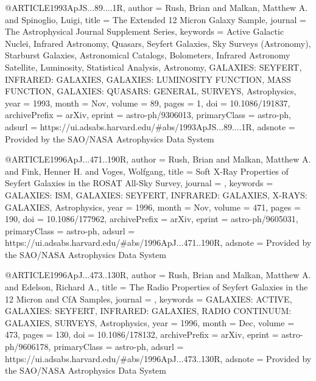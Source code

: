 \documentclass[longauth]{aa}
\begin{document}
{{{@ARTICLE{1993ApJS...89....1R,
       author = {{Rush}, Brian and {Malkan}, Matthew A. and {Spinoglio}, Luigi},
       title = {The Extended 12 Micron Galaxy Sample},
      journal = {The Astrophysical Journal Supplement Series},
     keywords = {Active Galactic Nuclei, Infrared Astronomy, Quasars, Seyfert Galaxies, Sky Surveys (Astronomy), Starburst Galaxies, Astronomical Catalogs, Bolometers, Infrared Astronomy Satellite, Luminosity, Statistical Analysis, Astronomy, GALAXIES: SEYFERT, INFRARED: GALAXIES, GALAXIES: LUMINOSITY FUNCTION, MASS FUNCTION, GALAXIES: QUASARS: GENERAL, SURVEYS, Astrophysics},
         year = 1993,
        month = Nov,
       volume = {89},
        pages = {1},
          doi = {10.1086/191837},
archivePrefix = {arXiv},
       eprint = {astro-ph/9306013},
 primaryClass = {astro-ph},
       adsurl = {https://ui.adsabs.harvard.edu/#abs/1993ApJS...89....1R},
      adsnote = {Provided by the SAO/NASA Astrophysics Data System}
}

@ARTICLE{1996ApJ...471..190R,
       author = {{Rush}, Brian and {Malkan}, Matthew A. and {Fink}, Henner H. and {Voges}, Wolfgang},
        title = {Soft X-Ray Properties of Seyfert Galaxies in the ROSAT All-Sky Survey},
      journal = {\apj},
     keywords = {GALAXIES: ISM, GALAXIES: SEYFERT, INFRARED: GALAXIES, X-RAYS: GALAXIES, Astrophysics},
         year = 1996,
        month = Nov,
       volume = {471},
        pages = {190},
          doi = {10.1086/177962},
archivePrefix = {arXiv},
       eprint = {astro-ph/9605031},
 primaryClass = {astro-ph},
       adsurl = {https://ui.adsabs.harvard.edu/#abs/1996ApJ...471..190R},
      adsnote = {Provided by the SAO/NASA Astrophysics Data System}
}

@ARTICLE{1996ApJ...473..130R,
       author = {{Rush}, Brian and {Malkan}, Matthew A. and {Edelson}, Richard A.},
        title = {The Radio Properties of Seyfert Galaxies in the 12 Micron and CfA Samples},
      journal = {\apj},
     keywords = {GALAXIES: ACTIVE, GALAXIES: SEYFERT, INFRARED: GALAXIES, RADIO CONTINUUM: GALAXIES, SURVEYS, Astrophysics},
         year = 1996,
        month = Dec,
       volume = {473},
        pages = {130},
          doi = {10.1086/178132},
archivePrefix = {arXiv},
       eprint = {astro-ph/9606178},
 primaryClass = {astro-ph},
       adsurl = {https://ui.adsabs.harvard.edu/#abs/1996ApJ...473..130R},
      adsnote = {Provided by the SAO/NASA Astrophysics Data System}
}

}}}
\end{document}
